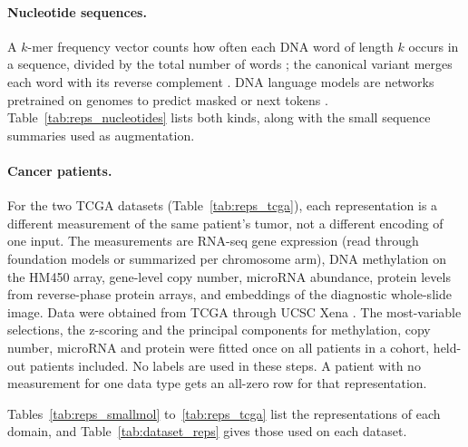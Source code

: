 \paragraph{Nucleotide sequences.} A $k$-mer frequency vector counts how often each DNA word of length $k$ occurs in a sequence, divided by the total number of words \citep{Vinga2003}; the canonical variant merges each word with its reverse complement \citep{Teeling2004}. DNA language models are networks pretrained on genomes to predict masked or next tokens \citep{Zhou2023DNABERT2, DallaTorre2025, Nguyen2023HyenaDNA}. Table~\ref{tab:reps_nucleotides} lists both kinds, along with the small sequence summaries used as augmentation.

\paragraph{Cancer patients.} For the two TCGA datasets (Table~\ref{tab:reps_tcga}), each representation is a different measurement of the same patient's tumor, not a different encoding of one input. The measurements are RNA-seq gene expression (read through foundation models or summarized per chromosome arm), DNA methylation on the HM450 array, gene-level copy number, microRNA abundance, protein levels from reverse-phase protein arrays, and embeddings of the diagnostic whole-slide image. Data were obtained from TCGA through UCSC Xena \citep{TCGA2013, Goldman2020}. The most-variable selections, the z-scoring and the principal components for methylation, copy number, microRNA and protein were fitted once on all patients in a cohort, held-out patients included. No labels are used in these steps. A patient with no measurement for one data type gets an all-zero row for that representation.

Tables~\ref{tab:reps_smallmol} to~\ref{tab:reps_tcga} list the representations of each domain, and Table~\ref{tab:dataset_reps} gives those used on each dataset.

